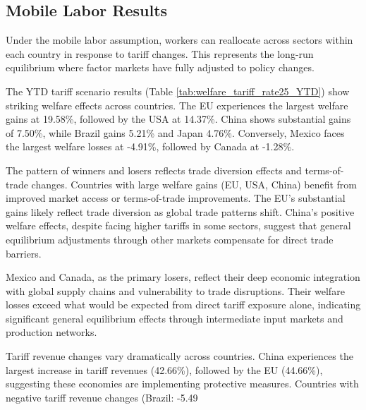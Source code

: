 \begin{landscape}
    \vspace*{\fill}
    
    \vspace*{\fill}
\end{landscape}
\subsection{Mobile Labor Results}

Under the mobile labor assumption, workers can reallocate across sectors within each country in response to tariff changes. This represents the long-run equilibrium where factor markets have fully adjusted to policy changes.

The YTD tariff scenario results (Table \ref{tab:welfare_tariff_rate25_YTD}) show striking welfare effects across countries. The EU experiences the largest welfare gains at 19.58\%, followed by the USA at 14.37\%. China shows substantial gains of 7.50\%, while Brazil gains 5.21\% and Japan 4.76\%. Conversely, Mexico faces the largest welfare losses at -4.91\%, followed by Canada at -1.28\%.

The pattern of winners and losers reflects trade diversion effects and terms-of-trade changes. Countries with large welfare gains (EU, USA, China) benefit from improved market access or terms-of-trade improvements. The EU's substantial gains likely reflect trade diversion as global trade patterns shift. China's positive welfare effects, despite facing higher tariffs in some sectors, suggest that general equilibrium adjustments through other markets compensate for direct trade barriers.

Mexico and Canada, as the primary losers, reflect their deep economic integration with global supply chains and vulnerability to trade disruptions. Their welfare losses exceed what would be expected from direct tariff exposure alone, indicating significant general equilibrium effects through intermediate input markets and production networks.

Tariff revenue changes vary dramatically across countries. China experiences the largest increase in tariff revenues (42.66\%), followed by the EU (44.66\%), suggesting these economies are implementing protective measures. Countries with negative tariff revenue changes (Brazil: -5.49%

\begin{landscape}
    \vspace*{\fill}
    
    \vspace*{\fill}
\end{landscape}
